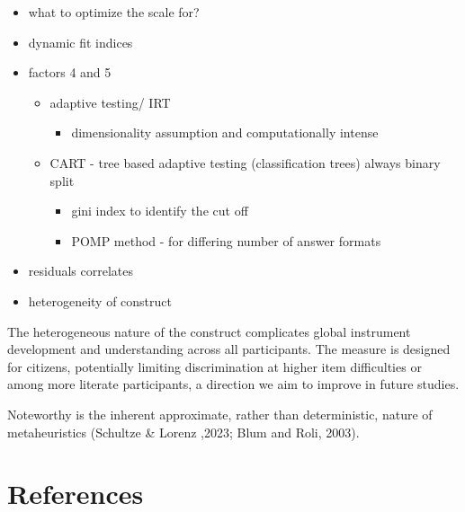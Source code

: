 \documentclass[
  12pt,
  a4paper,
  twoside]{article}
\providecommand{\tightlist}{%
  \setlength{\itemsep}{0pt}\setlength{\parskip}{0pt}}
\begin{document}
\begin{itemize}
\tightlist
\item
  what to optimize the scale for?
\item
  dynamic fit indices
\item
  factors 4 and 5

  \begin{itemize}
  \tightlist
  \item
    adaptive testing/ IRT

    \begin{itemize}
    \tightlist
    \item
      dimensionality assumption and computationally intense
    \end{itemize}
  \item
    CART - tree based adaptive testing (classification trees) always
    binary split

    \begin{itemize}
    \tightlist
    \item
      gini index to identify the cut off
    \item
      POMP method - for differing number of answer formats
    \end{itemize}
  \end{itemize}
\item
  residuals correlates
\item
  heterogeneity of construct
\end{itemize}

The heterogeneous nature of the construct complicates global instrument
development and understanding across all participants. The measure is
designed for citizens, potentially limiting discrimination at higher
item difficulties or among more literate participants, a direction we
aim to improve in future studies.

Noteworthy is the inherent approximate, rather than deterministic,
nature of metaheuristics (Schultze \& Lorenz ,2023; Blum and Roli,
2003).

\section*{References}\label{references}
\end{document}

